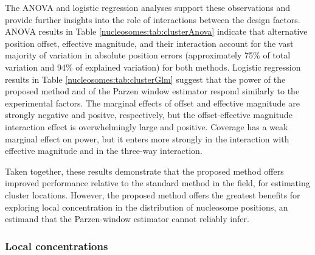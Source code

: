 The ANOVA and logistic regression analyses support these observations and provide further insights into the role of interactions between the design factors.
ANOVA results in Table \ref{nucleosomes:tab:clusterAnova} indicate that alternative position offset, effective magnitude, and their interaction account for the vast majority of variation in absolute position errors (approximately 75\% of total variation and 94\% of explained variation) for both methods.
Logistic regression results in Table \ref{nucleosomes:tab:clusterGlm} suggest that the power of the proposed method and of the Parzen window estimator respond similarly to the experimental factors.
The marginal effects of offset and effective magnitude are strongly negative and positve, respectively, but the offset-effective magnitude interaction effect is overwhelmingly large and positive.
Coverage has a weak marginal effect on power, but it enters more strongly in the interaction with effective magnitude and in the three-way interaction.

Taken together, these results demonstrate that the proposed method offers improved performance relative to the standard method in the field, for estimating cluster locations.
However, the proposed method offers the greatest benefits for exploring  local concentration in the distribution of nucleosome positions, an estimand that the Parzen-window estimator cannot reliably infer.

\subsubsection{Local concentrations}
\label{nucleosomes:sec:localPower}

